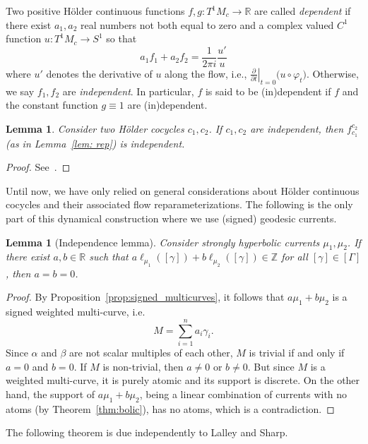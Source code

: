 \documentclass[12pt]{amsart}
\numberwithin{equation}{section}
\numberwithin{figure}{section}
\newtheorem{lemma}[equation]{Lemma}
\theoremstyle{definition}
\theoremstyle{plain}
\newcommand{\bb}[1]{\mathbb{#1}}
\begin{document}
Two positive H\"older continuous functions
$f,g \colon T^1 M_c \to \mathbb{R}$ are
called \emph{dependent} if there exist $a_1,a_2$ real numbers not both 
equal to zero and a complex valued $C^1$ function
$u \colon T^1 M_c \to S^1$ so that
\[
a_1 f_1 + a_2 f_2 = \frac{1}{2\pi i} \frac{u'}{u}
\]
where $u'$ denotes the derivative of $u$ along the flow, i.e., $\left.\frac{\partial}{\partial t}\right|_{t=0} \bigl(u \circ \varphi_t\bigr)$.
Otherwise, we say $f_1,f_2$ are \emph{independent}.
In particular, $f$ is said to be (in)dependent if $f$ and the constant function $g \equiv 1$ are (in)dependent.

\begin{lemma}
Consider two H\"older cocycles $c_1,c_2$.
If $c_1,c_2$ are independent, then $f_{c_1}^{c_2}$ (as in Lemma~\ref{lem: rep}) is independent.
\label{lem:f_is_indep}
\end{lemma}
\begin{proof}
See~\cite[Remark~2.11]{DM23:Correlation}.
\end{proof}

Until now, we have only relied on general considerations about H\"older continuous cocycles and their associated flow reparameterizations. The following is the only part of this dynamical construction where we use (signed) geodesic currents.

\begin{lemma}[Independence lemma]\label{lem:indep} Consider strongly hyperbolic currents $\mu_1,\mu_2$. If there exist $a,b\in\bb R$ such that $a\ell_{\mu_1}([\gamma])+b\ell_{\mu_2}([\gamma])\in\bb Z$ for all $[\gamma]\in[\Gamma]$, then $a=b=0$.
\end{lemma}

\begin{proof}
By Proposition~\ref{prop:signed_multicurves}, it follows that $a \mu_1+ b \mu_2$ is a signed weighted multi-curve, i.e.
\[
M=\sum_{i=1}^n a_i \gamma_i.
\]
Since $\alpha$ and $\beta$ are not scalar multiples of each other, $M$ is trivial if and only if $a=0$ and $b=0$.
If $M$ is non-trivial, then $a \neq 0$ or $b \neq 0$. But since $M$ is a weighted multi-curve, it is purely atomic and its support is discrete. On the other hand, the support of $a \mu_1 + b \mu_2$, being a linear combination of currents with no atoms (by Theorem~\ref{thm:bolic}), has no atoms, which is a contradiction.
\end{proof}

The following theorem is due independently to Lalley and Sharp.
\end{document}
